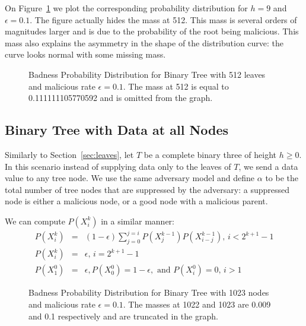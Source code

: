 \documentclass[11pt,twocolumn]{MyTightStyle}
\theoremstyle{plain}
\theoremstyle{definition}
\theoremstyle{remark}
\numberwithin{equation}{section}
\begin{document}
  On Figure~\ref{fig:distr} we plot the corresponding probability
  distribution for $h=9$ and $\epsilon=0.1$. The figure actually hides
  the mass at 512. This mass is several orders of magnitudes larger
  and is due to the probability of the root being malicious. This mass
  also explains the asymmetry in the shape of the distribution
  curve: the curve looks normal with some missing mass.

  \begin{figure}[htpb!]
    \begin{center}
      \caption{\label{fig:distr} Badness Probability Distribution for Binary Tree with
      512 leaves and malicious rate $\epsilon=0.1$. The mass at 512 is
      equal to 0.111111105770592 and is omitted from the graph.}
    \end{center}
  \end{figure}

  \subsection{Binary Tree with Data at all Nodes}
  \label{sec:nodes}
  Similarly to Section~\ref{sec:leaves}, let $T$ be a complete binary
  three of height $h \geq 0$. In this scenario instead of supplying data only to the
  leaves of $T$, we send a data value to any tree node. We use the
  same adversary model and define $\alpha$ to be the total number of
  tree nodes that are suppressed by the adversary: a suppressed node
  is either a malicious node, or a good node with a malicious parent.

  We can compute $P(X^k_i)$ in a similar manner:
  \begin{eqnarray}\label{eqn:notmalicious}
    P(X^k_i) &=& (1-\epsilon)\sum_{j=0}^{j=i}P(X^{k-1}_j)P(X^{k-1}_{i-j})
    \textrm{, $i<2^{k+1}-1$}\\
    P(X^k_i) &=& \epsilon \textrm{, $i=2^{k+1}-1$}\\
     P(X^0_1)&=&\epsilon,P(X^0_0)=1-\epsilon, \textrm{ and }P(X^0_i)=0
    \textrm{, $i>1$}
  \end{eqnarray}
  
  \begin{figure}[htpb!]
    \begin{center}
      \caption{\label{fig:distr_all} Badness Probability Distribution for Binary Tree with
      1023 nodes and malicious rate $\epsilon=0.1$. The masses at 1022
      and 1023 are 0.009 and 0.1 respectively and are truncated in the
      graph.}
    \end{center}
  \end{figure}
\end{document}

